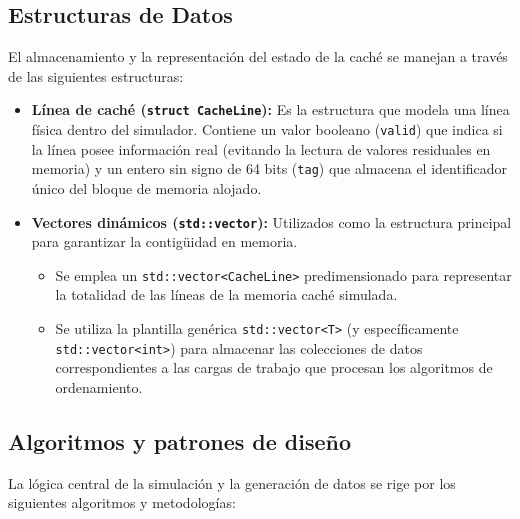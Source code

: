\documentclass[12pt, a4paper]{article}
\begin{document}
	\subsection{Estructuras de Datos}
	El almacenamiento y la representación del estado de la caché se manejan a través de las siguientes estructuras:
	
	\begin{itemize}
		\item \textbf{Línea de caché (\texttt{struct CacheLine}):} Es la estructura que modela una línea física dentro del simulador. Contiene un valor booleano (\texttt{valid}) que indica si la línea posee información real (evitando la lectura de valores residuales en memoria) y un entero sin signo de 64 bits (\texttt{tag}) que almacena el identificador único del bloque de memoria alojado.
		
		\item \textbf{Vectores dinámicos (\texttt{std::vector}):} Utilizados como la estructura principal para garantizar la contigüidad en memoria. 
		\begin{itemize}
			\item Se emplea un \texttt{std::vector<CacheLine>} predimensionado para representar la totalidad de las líneas de la memoria caché simulada.
			
			\item Se utiliza la plantilla genérica \texttt{std::vector<T>} (y específicamente \texttt{std::vector<int>}) para almacenar las colecciones de datos correspondientes a las cargas de trabajo que procesan los algoritmos de ordenamiento.
		\end{itemize}
	\end{itemize}
	
	\subsection{Algoritmos y patrones de diseño}
	La lógica central de la simulación y la generación de datos se rige por los siguientes algoritmos y metodologías:
	
\end{document}
